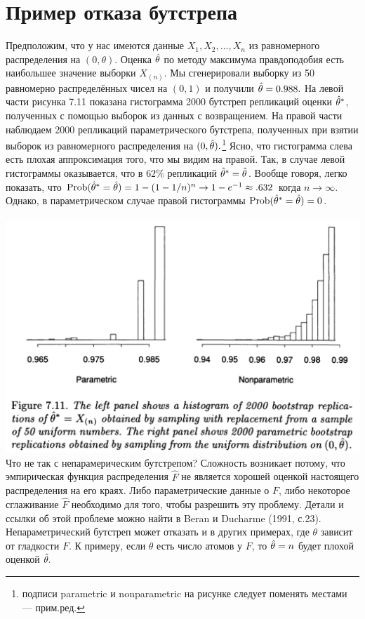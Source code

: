 \section{Пример отказа бутстрепа}

Предположим, что у нас имеются данные $X_1, X_2,\ldots, X_n$ из равномерного распределения на $(0, \theta)$. Оценка $\hat \theta$ по методу максимума правдоподобия есть наибольшее значение выборки $X_{(n)}.$ Мы сгенерировали выборку из 50 равномерно распределённых чисел на $(0,1)$ и получили $\hat \theta = 0.988.$ На левой части рисунка 7.11 показана гистограмма 2000 бутстреп репликаций оценки $\hat \theta^*$, полученных с помощью выборок из данных с возвращением. На правой части наблюдаем 2000 репликаций параметрического бутстрепа, полученных при взятии выборок из равномерного распределения на $(0, \hat \theta).$\footnote{подписи parametric и nonparametric на рисунке следует поменять местами --- прим.ред.} Ясно, что гистограмма слева есть плохая аппроксимация того, что мы видим на правой. Так, в случае левой гистограммы оказывается, что в $62\%$ репликаций $\hat \theta^* = \hat \theta$. Вообще говоря, легко показать, что $\text{Prob}(\hat \theta^* = \hat \theta) = 1 - (1 - 1/n)^n \rightarrow 1 - e^{-1} \approx .632$ когда $n \rightarrow \infty.$ Однако, в параметрическом случае правой гистограммы $\text{Prob}(\hat \theta^* = \hat \theta) = 0$.
\\~\\
\noindent
\includegraphics[width=0.9\linewidth]{6/f711.png}
\newline
\setcounter{table}{5} 
Что не так с непарамерическим бутстрепом? Сложность возникает потому, что эмпирическая функция распределения $\hat F$ не является хорошей оценкой настоящего распределения на его краях. Либо параметрические данные о $F$, либо некоторое сглаживание $\hat F$ необходимо для того, чтобы разрешить эту проблему. Детали и ссылки об этой проблеме можно найти в Beran и Ducharme (1991, с.23). Непараметрический бутстреп может отказать и в других примерах, где $\theta$ зависит от гладкости $F.$ К примеру, если $\theta$ есть число атомов у $F$, то $\hat \theta = n$ будет плохой оценкой $\hat \theta.$ 